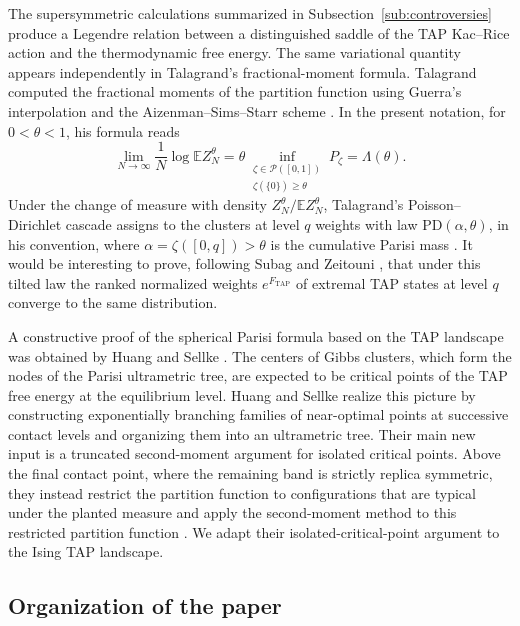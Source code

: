 \documentclass[a4paper,10pt,reqno]{amsart}
\numberwithin{equation}{section}
\newcommand{\dE}{\mathbb{E}}%
\newcommand{\mc}{\mathcal}
\newcommand{\TAP}{\mathrm{TAP}}
\begin{document}
	The supersymmetric calculations summarized in
	Subsection~\ref{sub:controversies} produce a Legendre relation between a
	distinguished saddle of the TAP Kac--Rice action and the thermodynamic free
	energy. The same variational quantity appears independently in Talagrand's
	fractional-moment formula. Talagrand computed the fractional moments of the
	partition function using Guerra's interpolation and the
	Aizenman--Sims--Starr scheme \cite[Section~7]{LDTalagrand}. In the present notation, for
	\(0<\theta<1\), his formula reads
	\[
	\lim_{N\to\infty}\frac1N\log\dE Z_N^\theta
	=
	\theta
	\inf_{\substack{\zeta\in\mc P([0,1])\\
			\zeta(\{0\})\ge\theta}}
	P_\zeta
	=
	\Lambda(\theta).
	\]
	Under the change of measure with density
	\(Z_N^\theta/\dE Z_N^\theta\), Talagrand's Poisson--Dirichlet cascade
	assigns to the clusters at level \(q\) weights with law
	\(\mathrm{PD}(\alpha,\theta)\), in his convention, where
	\(\alpha=\zeta([0,q])>\theta\) is the cumulative Parisi mass
	\cite[Sections~2 and~5]{LDTalagrand}. It would be interesting to prove,
	following Subag and Zeitouni \cite{SubagZeitouniExtremal}, that under this
	tilted law the ranked normalized weights \(e^{F_{\TAP}}\) of extremal TAP
	states at level \(q\) converge to the same distribution.
	
	A constructive proof of the spherical Parisi formula based on the TAP
	landscape was obtained by Huang and Sellke
	\cite[Theorem~1.5 and Corollary~1.6]{HuangSellke}. The centers of Gibbs
	clusters, which form the nodes of the Parisi ultrametric tree, are expected
	to be critical points of the TAP free energy at the equilibrium level.
	Huang and Sellke realize this picture by constructing exponentially
	branching families of near-optimal points at successive contact levels and
	organizing them into an ultrametric tree. Their main new input is a
	truncated second-moment argument for isolated critical points. Above the
	final contact point, where the remaining band is strictly replica
	symmetric, they instead restrict the partition function to configurations
	that are typical under the planted measure and apply the second-moment
	method to this restricted partition function
	\cite[Proposition~2.7]{HuangSellke}. We adapt their
	isolated-critical-point argument to the Ising TAP landscape.
	
	\subsection{Organization of the paper}\label{sub:organization}
	
\end{document}
